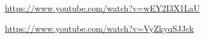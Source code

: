  
 
 
 
 

\url{https://www.youtube.com/watch?v=wEY2I3X1LaU}

\url{https://www.youtube.com/watch?v=VyZkyqSJJck}
